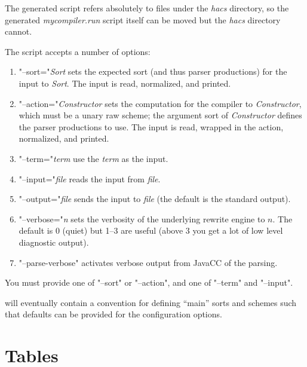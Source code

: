 \documentclass[11pt]{article} %
\begin{document}
\begin{manual}
\begin{enumerate}
  \end{enumerate}
  The generated script refers absolutely to files under the \emph{hacs} directory, so the generated
  \emph{mycompiler.run} script itself can be moved but the \emph{hacs} directory cannot.

  The script accepts a number of options:
  \begin{enumerate}

  \item "--sort="\emph{Sort} sets the expected sort (and thus parser productions) for the input to
    \emph{Sort}. The input is read, normalized, and printed.

  \item "--action="\emph{Constructor} sets the computation for the compiler to \emph{Constructor},
    which must be a unary raw scheme; the argument sort of \emph{Constructor} defines the parser
    productions to use.  The input is read, wrapped in the action, normalized, and printed.

  \item "--term="\emph{term} use the \emph{term} as the input.

  \item "--input="\emph{file} reads the input from \emph{file}.

  \item "--output="\emph{file} sends the input to \emph{file} (the default is the standard output).

  \item "--verbose="\emph{n} sets the verbosity of the underlying \CRSX rewrite engine to $n$. The
    default is 0 (quiet) but 1--3 are useful (above 3 you get a lot of low level diagnostic output).

  \item "--parse-verbose" activates verbose output from JavaCC of the parsing.

  \end{enumerate}
  You must provide one of "--sort" or "--action", and one of "--term" and "--input".

  \HAX will eventually contain a convention for defining ``main'' sorts and schemes such that
  defaults can be provided for the configuration options.
\end{manual}



\appendix\small

\section{Tables}
\label{app:tables}
\end{document}
